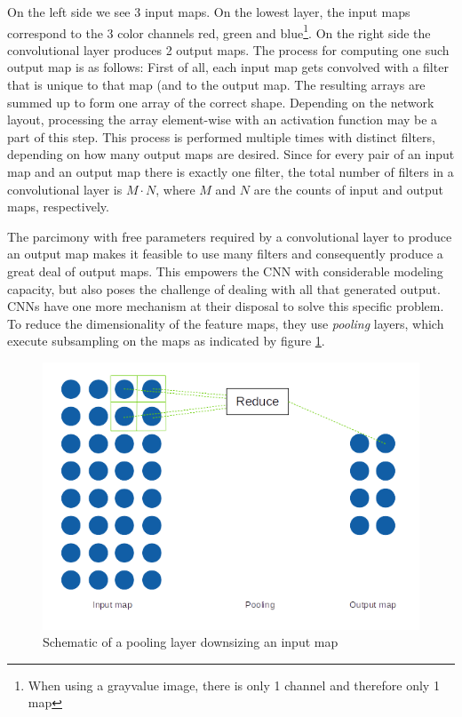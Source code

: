 \documentclass[11pt, a4paper]{article}
\begin{document}
On the left side we see 3 input maps. On the lowest layer, the input maps correspond to the 3 color channels red, green and blue\footnote{When using a grayvalue image, there is only 1 channel and therefore only 1 map}. On the right side the convolutional layer produces 2 output maps. The process for computing one such output map is as follows: First of all, each input map gets convolved with a filter that is unique to that map (and to the output map. The resulting arrays are summed up to form one array of the correct shape. Depending on the network layout, processing the array element-wise with an activation function may be a part of this step. This process is performed multiple times with distinct filters, depending on how many output maps are desired. Since for every pair of an input map and an output map there is exactly one filter, the total number of filters in a convolutional layer is $M \cdot N$, where $M$ and $N$ are the counts of input and output maps, respectively.

The parcimony with free parameters required by a convolutional layer to produce an output map makes it feasible to use many filters and consequently produce a great deal of output maps. This empowers the CNN with considerable modeling capacity, but also poses the challenge of dealing with all that generated output. CNNs have one more mechanism at their disposal to solve this specific problem. To reduce the dimensionality of the feature maps, they use \emph{pooling} layers, which execute subsampling on the maps as indicated by figure \ref{fig:pooling-layer}.

\begin{figure}[htp]
	\centering
	\includegraphics[scale=1.00]{images/pooling_layer.png}
	\caption{Schematic of a pooling layer downsizing an input map}
	\label{fig:pooling-layer}
\end{figure}
\end{document}
